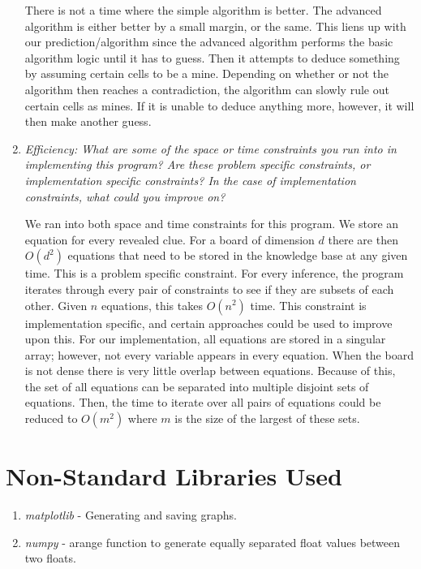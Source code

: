 \documentclass[12pt, twoside]{article}
\begin{document}
\begin{enumerate}[itemsep=2mm,parsep=4mm]
        There is not a time where the simple algorithm is better. The advanced algorithm is either better by a small margin, or the same. This liens up with our prediction/algorithm since the advanced algorithm performs the basic algorithm logic until it has to guess. Then it attempts to deduce something by assuming certain cells to be a mine. Depending on whether or not the algorithm then reaches a contradiction, the algorithm can slowly rule out certain cells as mines. If it is unable to deduce anything more, however, it will then make another guess.

        \vfill
        \pagebreak

    \item 
        \textit{Efficiency: What are some of the space or time constraints you run into in implementing this program? Are these problem specific constraints, or implementation specific constraints? In the case of implementation constraints, what could you improve on?}

        We ran into both space and time constraints for this program. We store an equation for every revealed clue. For a board of dimension $d$ there are then $O(d^2)$ equations that need to be stored in the knowledge base at any given time. This is a problem specific constraint. 
        \newline
        \newline
        For every inference, the program iterates through every pair of constraints to see if they are subsets of each other. Given $n$ equations, this takes $O(n^2)$ time. This constraint is implementation specific, and certain approaches could be used to improve upon this. For our implementation, all equations are stored in a singular array; however, not every variable appears in every equation. When the board is not dense there is very little overlap between equations. Because of this, the set of all equations can be separated into multiple disjoint sets of equations. Then, the time to iterate over all pairs of equations could be reduced to $O(m^2)$ where $m$ is the size of the largest of these sets.

\end{enumerate}
 
\vfill
\pagebreak
\section{Non-Standard Libraries Used}

\begin{enumerate}
    \item
        \textit{matplotlib} - Generating and saving graphs.
    \item
        \textit{numpy} - arange function to generate equally separated float values between two floats.
\end{enumerate}
 
\end{document}
